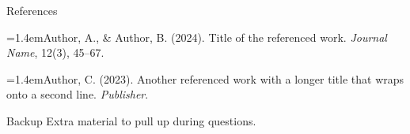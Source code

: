 \documentclass[aspectratio=169,t]{beamer}
\begin{document}
\begin{frame}[allowframebreaks]{References}
  \footnotesize
  \setlength{\parskip}{0.7em}\setlength{\parindent}{0pt}
  \newcommand{\refentry}{\par\hangindent=1.4em\relax}
  \refentry Author, A., \& Author, B. (2024). Title of the referenced work.
       \textit{Journal Name}, 12(3), 45--67.
  \refentry Author, C. (2023). Another referenced work with a longer title that
       wraps onto a second line. \textit{Publisher}.
\end{frame}

\appendix
\begin{frame}{Backup}
  Extra material to pull up during questions.
\end{frame}
\end{document}
